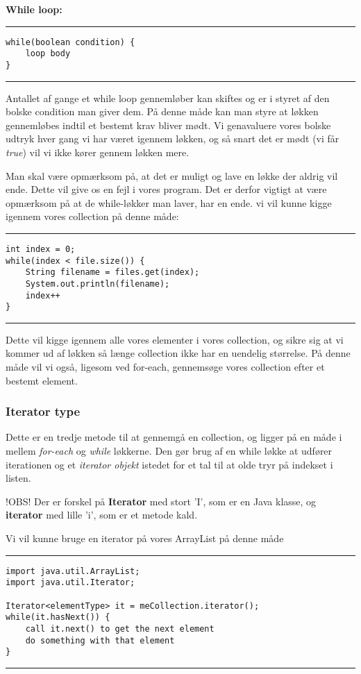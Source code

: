 \documentclass{article}
\begin{document}
\noindent\textbf{While loop:}
\vspace{0.3em}
\hrule
\begin{verbatim}
while(boolean condition) {
    loop body
}
\end{verbatim}
\hrule\vspace{0.3em}
Antallet af gange et while loop gennemløber kan skiftes og er i styret af den bolske condition man giver dem. På denne måde kan man styre at løkken gennemløbes indtil et bestemt krav bliver mødt. Vi genavaluere vores bolske udtryk hver gang vi har været igennem løkken, og så snart det er mødt (vi får \textit{true}) vil vi ikke kører gennem løkken mere.

Man skal være opmærksom på, at det er muligt og lave en løkke der aldrig vil ende. Dette vil give os en fejl i vores program. Det er derfor vigtigt at være opmærksom på at de while-løkker man laver, har en ende. vi vil kunne kigge igennem vores collection på denne måde:
\vspace{0.3em}
\hrule
\begin{verbatim}
int index = 0;
while(index < file.size()) {
    String filename = files.get(index);
    System.out.println(filename);
    index++
}
\end{verbatim}
\hrule
\vspace{0.3em}
Dette vil kigge igennem alle vores elementer i vores collection, og sikre sig at vi kommer ud af løkken så længe collection ikke har en uendelig størrelse.
På denne måde vil vi også, ligesom ved for-each, gennemsøge vores collection efter et bestemt element.

\subsubsection*{Iterator type}
Dette er en tredje metode til at gennemgå en collection, og ligger på en måde i mellem \textit{for-each} og \textit{while} løkkerne. Den gør brug af en while løkke at udfører iterationen og et \textit{iterator objekt} istedet for et tal til at olde tryr på indekset i listen.

!OBS! Der er forskel på \textbf{Iterator} med stort 'I', som er en Java klasse, og \textbf{iterator} med lille 'i', som er et metode kald.

Vi vil kunne bruge en iterator på vores ArrayList på denne måde
\vspace{0.3em}\hrule
\begin{verbatim}
import java.util.ArrayList;
import java.util.Iterator;

Iterator<elementType> it = meCollection.iterator();
while(it.hasNext()) {
    call it.next() to get the next element
    do something with that element
}
\end{verbatim}
\hrule \vspace{0.3em}
\end{document}
